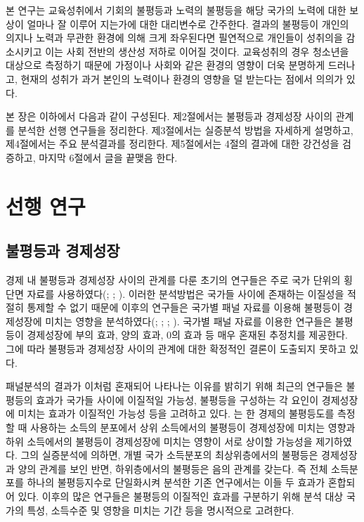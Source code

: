\label{ans5-1}
본 연구는 교육성취에서 기회의 불평등과 노력의 불평등을 해당 국가의 노력에 대한 보상이 얼마나 잘 이루어 지는가에 대한 대리변수로 간주한다.
결과의 불평등이 개인의 의지나 노력과 무관한 환경에 의해 크게 좌우된다면 필연적으로 개인들이 성취의을 감소시키고 이는 사회 전반의 생산성 저하로 이어질 것이다.
교육성취의 경우 청소년을 대상으로 측정하기 때문에 가정이나 사회와 같은 환경의 영향이 더욱 분명하게 드러나고, 현재의 성취가 과거 본인의 노력이나 환경의 영향을 덜 받는다는 점에서 의의가 있다.

본 장은 이하에서 다음과 같이 구성된다.
제2절에서는 불평등과 경제성장 사이의 관계를 분석한 선행 연구들을 정리한다.
제3절에서는 실증분석 방법을 자세하게 설명하고, 제4절에서는 주요 분석결과를 정리한다.
제5절에서는 4절의 결과에 대한 강건성을 검증하고, 마지막 6절에서 글을 끝맺음 한다.

\section{선행 연구}
\subsection{불평등과 경제성장}
경제 내 불평등과 경제성장 사이의 관계를 다룬 초기의 연구들은 주로 국가 단위의 횡단면 자료를 사용하였다(\citet{barro91}; \citet{anr94}; \citet{pnt94}).
이러한 분석방법은 국가들 사이에 존재하는 이질성을 적절히 통제할 수 없기 때문에 이후의 연구들은 국가별 패널 자료를 이용해 불평등이 경제성장에 미치는 영향을 분석하였다(\citet{lnz98}; \citet{barro20}; \citet{forbes00}; \citet{bnd03}).
국가별 패널 자료를 이용한 연구들은 불평등이 경제성장에 부의 효과, 양의 효과, 0의 효과 등 매우 혼재된 추정치를 제공한다.
그에 따라 불평등과 경제성장 사이의 관계에 대한 확정적인 결론이 도출되지 못하고 있다.

패널분석의 결과가 이처럼 혼재되어 나타나는 이유를 밝히기 위해 최근의 연구들은 불평등의 효과가 국가들 사이에 이질적일 가능성, 불평등을 구성하는 각 요인이 경제성장에 미치는 효과가 이질적인 가능성 등을 고려하고 있다.
\citet{voit05, voit11}는 한 경제의 불평등도를 측정할 때 사용하는 소득의 분포에서 상위 소득에서의 불평등이 경제성장에 미치는 영향과 하위 소득에서의 불평등이 경제성장에 미치는 영향이 서로 상이할 가능성을 제기하였다.
그의 실증분석에 의하면, 개별 국가 소득분포의 최상위층에서의 불평등은 경제성장과 양의 관계를 보인 반면, 하위층에서의 불평등은 음의 관계를 갖는다.
즉 전체 소득분포를 하나의 불평등지수로 단일화시켜 분석한 기존 연구에서는 이들 두 효과가 혼합되어 있다.
\citet{voit05, voit11} 이후의 많은 연구들은 불평등의 이질적인 효과를 구분하기 위해 분석 대상 국가의 특성, 소득수준 및 영향을 미치는 기간 등을 명시적으로 고려한다.

